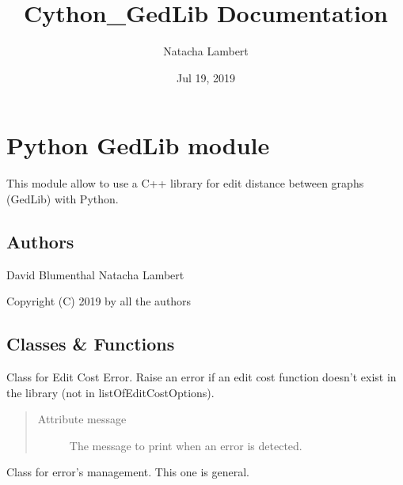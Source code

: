 \documentclass[letterpaper,10pt,english]{sphinxmanual}
\title{Cython\_GedLib Documentation}
\date{Jul 19, 2019}
\author{Natacha Lambert}
\begin{document}
\maketitle
\tableofcontents
{}\label{index::doc}

\label{doc:module-PythonGedLib}

\chapter{Python GedLib module}
\label{doc:welcome-to-python-gedlib-s-documentation}\label{doc::doc}\label{doc:python-gedlib-module}
This module allow to use a C++ library for edit distance between graphs (GedLib) with Python.


\section{Authors}
\label{doc:authors}
David Blumenthal
Natacha Lambert

Copyright (C) 2019 by all the authors


\section{Classes \& Functions}
\label{doc:classes-functions}

\begin{fulllineitems}
\label{doc:PythonGedLib.EditCostError}
Class for Edit Cost Error. Raise an error if an edit cost function doesn't exist in the library (not in listOfEditCostOptions).
\begin{quote}\begin{description}
\item[{Attribute message}] \leavevmode
The message to print when an error is detected.

\end{description}\end{quote}

\end{fulllineitems}


\begin{fulllineitems}
\label{doc:PythonGedLib.Error}
Class for error's management. This one is general.

\end{fulllineitems}
\end{document}
